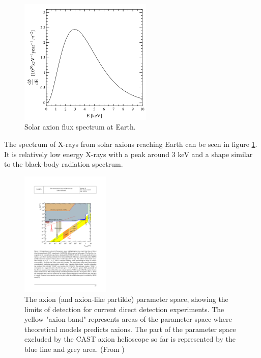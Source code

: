 \begin{figure}[htbp]
  \centering
    \includegraphics[height=6cm]{figures/cast/axion_spectrum.png}
  \caption{\footnotesize Solar axion flux spectrum at Earth. }
  \label{fig:axion_spectrum}
\end{figure}

The spectrum of X-rays from solar axions reaching Earth can be seen in figure \ref{fig:axion_spectrum}. It is relatively low energy X-rays with a peak around 3 keV and a shape similar to the black-body radiation spectrum.

\begin{figure}[htbp]
  \centering
    \includegraphics[height=6cm]{figures/cast/axion_search_cast2.pdf}
  \caption{\footnotesize The axion (and axion-like partikle) parameter space, showing the limits of detection for current direct detection experiments. The yellow "axion band" represents areas of the parameter space where theoretical models predicts axions. The part of the parameter space excluded by the CAST axion helioscope so far is represented by the blue line and grey area. (From \cite{Irastorza:2013uu})}
  \label{fig:axion_search_cast}
\end{figure}

